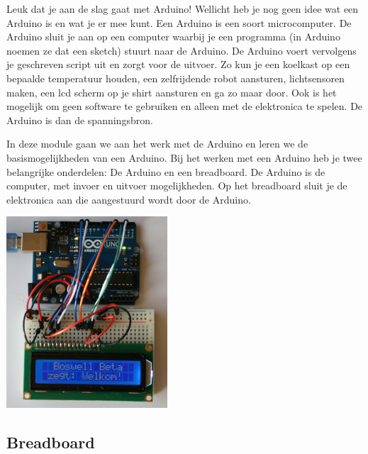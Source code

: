 \documentclass{arduino}
\begin{document}
\begin{minipage}[m]{0.6\textwidth}
Leuk dat je aan de slag gaat met Arduino! Wellicht heb je nog geen idee wat een Arduino is en wat je er mee kunt. Een Arduino is een soort microcomputer. De Arduino sluit je aan op een computer waarbij je een programma (in Arduino noemen ze dat een sketch) stuurt naar de Arduino. De Arduino voert vervolgens je geschreven script uit en zorgt voor de uitvoer. Zo kun je een koelkast op een bepaalde temperatuur houden, een zelfrijdende robot aansturen, lichtsensoren maken, een lcd scherm op je shirt aansturen en ga zo maar door. Ook is het mogelijk om geen software te gebruiken en alleen met de elektronica te spelen. De Arduino is dan de spanningsbron.

In deze module gaan we aan het werk met de Arduino en leren we de basismogelijkheden van een Arduino. Bij het werken met een Arduino heb je twee belangrijke onderdelen: De Arduino en een breadboard. De Arduino is de computer, met invoer en uitvoer mogelijkheden. Op het breadboard sluit je de elektronica aan die aangestuurd wordt door de Arduino.
\end{minipage}\hfill\begin{minipage}[m]{0.39\textwidth}
\raggedleft
\includegraphics[width=6cm]{2. Aurduino - welcome}
\end{minipage}

\subsection{Breadboard}
\end{document}

